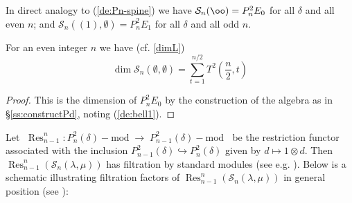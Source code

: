 \documentclass[reqno,10pt,a4paper]{amsart}
\DeclareMathOperator{\Res}{Res}
\newcommand{\blue}[1]{\textcolor{blue}{#1}}
\newcommand{\red}[1]{\textcolor{red}{#1}}
\newcommand{\ppm}[1]{\red{#1}}
\newcommand{\ca}[1]{\blue{#1}}
\newcommand{\nk}{n}  %
\newcommand{\cell}{\mathcal{S}}
\newcommand{\T}{T^2}  %
\newcommand{\ignore}[1]{}
\newcommand{\rmP}{{\mathtt P}} %
\newcommand{\rmPe}{{\rmP}^{(e)}} %
\begin{document}
\mdef  \label{de:Pn2-spine}
In direct analogy to (\ref{de:Pn-spine}) we have 
$ \cell_\nk(\oo ) = P^2_n E_0$
for all $\delta$ and all even $n$;
and 
$ \cell_\nk((1),\emptyset) = P^2_n E_1$
for all $\delta$ and all odd $n$. 


\ignore{{ 
Recall %
$ \; 
\T(m,t) = \mbox{number of ways of partitioning %
a set of size $2m$ into $t$ blocks of even size}
$
\footnote{{ 
Remark: Like Stirling numbers, the numbers $\T(m,t)$   obey 
various nice identities (not needed here) such as 
$$
\T(m,t)=\frac{1}{t!2^{t-1}}\sum_{j=1}^t(-1)^{t-j}{2t \choose t-j} j^{2m}.
$$
They are $A156289$ in the Encyclopedia of Integer Sequences~\cite{SloaneOEIS}.
 }}
 }}



\begin{lem}   \label{lem:dimS}
For an even integer $\nk$ we have 
(cf. \ref{dimL})
$$
\dim \cell_\nk(\emptyset,\emptyset) = 
\sum_{t=1}^{\nk/2} \T(\frac{\nk}{2}, t)
$$  %
\end{lem}
\begin{proof}
    This is the dimension of $P^2_n E_0$ by the construction of the algebra
    as in \S\ref{ss:constructPd}, 
    noting (\ref{de:bell1}).
\end{proof}




\newcommand{\Ress}[2]{\Res^{#1}_{#2}}  %

\mdef \label{res:Tonal}
Let 
$\; \Ress{n}{n-1}: 
P_\nk^2(\delta)-\text{mod} \;\to\; P_{n-1}^2(\delta)-\text{mod} \;\;$ 
be the restriction functor associated with the inclusion $P_{n-1}^2(\delta)\hookrightarrow  P_\nk^2(\delta)$ given by 
$d\mapsto 1\otimes d$.
Then 
$\Ress{n}{n-1}(\cell_n(
\lambda, \mu))$ 
has filtration by standard modules 
{(see e.g. \cite[11.3]{amm2019tonal})}. 
Below is a schematic illustrating 
{filtration factors of 
$  \Ress{n}{n-1} ( \cell_n( \lambda, \mu))$}
in general position (see \cite[11.3 and 11.4]{amm2019tonal}):

\end{document}
